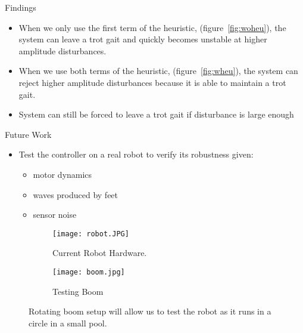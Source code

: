\textcolor{prime}{\textsf{Findings}} \\
\begin{itemize}
\item When we only use the first term of the heuristic, (figure~\ref{fig:woheu}),  the system can leave a trot gait and quickly becomes unstable at higher amplitude disturbances.

\item When we use both terms of the heuristic, (figure~\ref{fig:wheu}), the system can reject higher amplitude disturbances because it is able to maintain a trot gait. 

\item System can still be forced to leave a trot gait if disturbance is large enough
\end{itemize}

\vspace{2EX}
\textcolor{prime}{\textsf{Future Work}} \\
\begin{itemize}
	\item Test the controller on a real robot to verify its robustness given:
	\begin{itemize}
		\item motor dynamics
		\item waves produced by feet
		\item sensor noise
	\end{itemize}
\end{itemize}

\vspace{2EX}
\begin{figure}[h]
\centering
\begin{subfigure}[t]{0.47\textwidth}
    \centering
    \texttt{[image: robot.JPG]}
    \caption{Current Robot Hardware.}
	\label{fig:robot}
\end{subfigure}
\quad
\begin{subfigure}[t]{0.47\textwidth}
    \centering
    \texttt{[image: boom.jpg]}
    \caption{Testing Boom}
	\label{fig:boom}
\end{subfigure}
\vspace{0.5EX}
\caption{Rotating boom setup will allow us to test the robot as it runs in a circle in a small pool.} 
\label{fig:test}
\end{figure}
